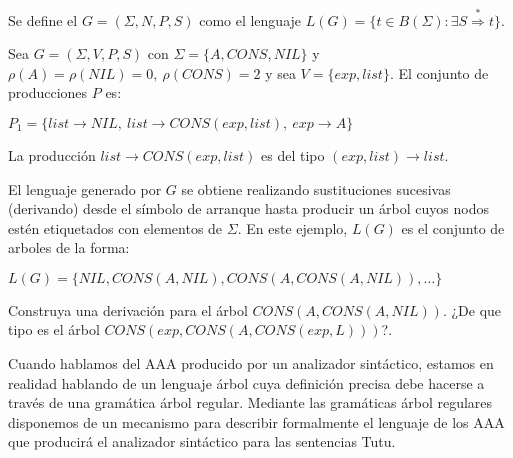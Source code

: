 \begin{definition}
Se define el  $G = (\Sigma, N, P, S)$
como el lenguaje $L(G) = \{ t \in B(\Sigma): \exists S \stackrel{*}{\Longrightarrow} t \}$.
\end{definition}

\begin{example}
\label{example:eyaplisttreegrammar}
Sea $G = (\Sigma, V, P, S)$ con
$\Sigma = \{A, CONS, NIL \}$ y $\rho(A) = \rho(NIL) = 0,\ \rho(CONS) = 2$
y sea $V = \{ exp, list \}$. El conjunto de producciones $P$ es:

\begin{center}
$P_1 = \{ list \rightarrow NIL,\ list \rightarrow CONS(exp,list),\ exp \rightarrow A \}$
\end{center}

La producción $list \rightarrow CONS(exp,list)$ es del tipo $(exp,list) \rightarrow list$. 

El lenguaje generado por $G$ se obtiene realizando sustituciones
sucesivas (derivando) desde el símbolo de arranque hasta producir un
árbol cuyos nodos estén etiquetados con elementos de $\Sigma$. 
En este ejemplo, $L(G)$ es el conjunto de arboles de la forma:

\begin{center}
$L(G) = \{ NIL, CONS(A, NIL), CONS(A, CONS(A,NIL)), \ldots \}$
\end{center}

\end{example}

\begin{exercise} 
Construya una derivación para el árbol $CONS(A, CONS(A,NIL))$.
¿De que tipo es el árbol $CONS(exp, CONS(A, CONS(exp,L)))$?.
\end{exercise}

Cuando hablamos del AAA producido por un analizador sintáctico,
estamos en realidad hablando de un lenguaje árbol cuya definición 
precisa debe hacerse a través de una gramática
árbol regular.
Mediante las gramáticas árbol regulares disponemos de un mecanismo para
describir formalmente el lenguaje de los 
AAA que producirá el analizador sintáctico
para las sentencias Tutu.

